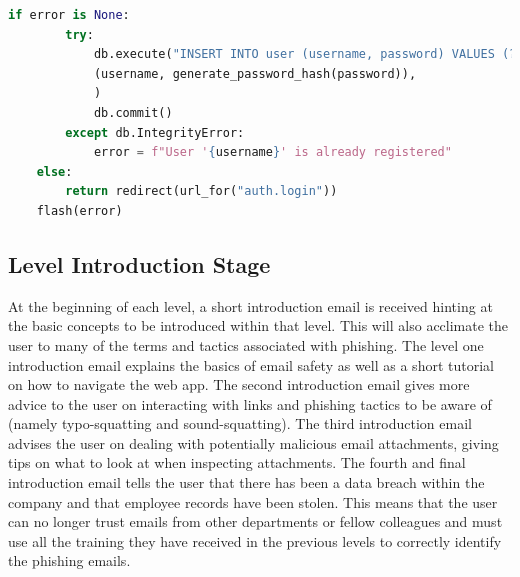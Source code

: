 \documentclass{l4proj}
\begin{document}
\begin{lstlisting}[H, language=python, caption={Registration authentication checks in the auth.py file}, label=lst:flask_auth]
    if error is None:
		try:
			db.execute("INSERT INTO user (username, password) VALUES (?, ?)",
			(username, generate_password_hash(password)),
			)
			db.commit()
		except db.IntegrityError:
			error = f"User '{username}' is already registered"
	else:
		return redirect(url_for("auth.login"))
	flash(error)
\end{lstlisting}

\subsection{Level Introduction Stage}
At the beginning of each level, a short introduction email is received hinting at the basic concepts to be introduced within that level. This will also acclimate the user to many of the terms and tactics associated with phishing. The level one introduction email explains the basics of email safety as well as a short tutorial on how to navigate the web app. The second introduction email gives more advice to the user on interacting with links and phishing tactics to be aware of (namely typo-squatting and sound-squatting). The third introduction email advises the user on dealing with potentially malicious email attachments, giving tips on what to look at when inspecting attachments. The fourth and final introduction email tells the user that there has been a data breach within the company and that employee records have been stolen. This means that the user can no longer trust emails from other departments or fellow colleagues and must use all the training they have received in the previous levels to correctly identify the phishing emails.
\end{document}
